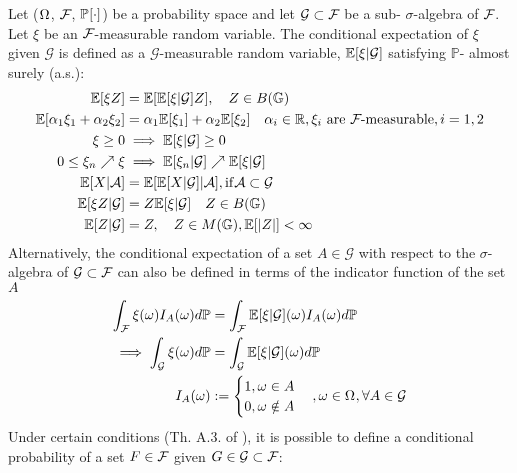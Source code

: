 \begin{defn}
	Let ($\Omega_{{}}$, $ \mathcal{F}_{{}}$, $\mathbb{P}_{{}}{[\cdot]}$) be a probability space and let $\mathcal{G} \subset \mathcal{F}_{{}}$  be a sub- $\sigma$-algebra of $\mathcal{F}_{{}}$. Let $\xi$ be an $\mathcal{F}_{{}}$-measurable random variable. The conditional expectation of $\xi$ given $\mathcal{G}$ is defined as a $\mathcal{G}$-measurable random variable, $\mathbb{E}[\xi | \mathcal{G}]$ satisfying $\mathbb{P}$- {\color{red}almost surely} (a.s.):
	\begin{align}
	 \mathbb{E}[\xi Z] & = \mathbb{E}[\mathbb{E}[\xi | \mathcal{G}]Z], \quad Z \in B(\mathbb{G}) \\
	 \mathbb{E}[\alpha_1 \xi_1 + \alpha_2 \xi_2] & = \alpha_1 \mathbb{E}[\xi_1]  + \alpha_2 \mathbb{E}[\xi_2]  \quad \alpha_i \in \mathbb{R}, \xi_i \text{ are $\mathcal{F}_{{}}$-measurable}, i = 1,2 \\
	 \xi \geq 0 & \implies \mathbb{E}[\xi | \mathcal{G}] \geq 0  \\
	 0 \leq \xi_n \nearrow \xi & \implies \mathbb{E}[\xi_n | \mathcal{G}] \nearrow \mathbb{E}[\xi | \mathcal{G}] \\
	\mathbb{E}[X|\mathcal{A}] & = \mathbb{E}[\mathbb{E}[X|\mathcal{G}]|\mathcal{A}], \mathrm{if} \mathcal{A} \subset \mathcal{G} \\
 	\mathbb{E}[\xi Z | \mathcal{G}] & = Z \mathbb{E}[\xi | \mathcal{G}] \quad Z \in B(\mathbb{G}) \\
 	\mathbb{E}[ Z | \mathcal{G}] & =Z, \quad Z \in M(\mathbb{G}), \mathbb{E}[|Z|] < \infty
	\end{align} 	
Alternatively, the conditional expectation of a set $A \in \mathcal{G}$ with respect to the $\sigma$-algebra of $\mathcal{G} \subset \mathcal{F}_{{}}$ can also be defined in terms of the indicator function of the set $A$
\begin{align}
\int_{\mathcal{F}}  \xi(\omega) I_A (\omega) d\mathbb{P} &= \int_{\mathcal{F}}  \mathbb{E}[\xi | \mathcal{G}](\omega) I_A(\omega) d\mathbb{P} \\
\implies \int_{\mathcal{G}}  \xi(\omega) d\mathbb{P} &= \int_{\mathcal{G}}  \mathbb{E}[\xi | \mathcal{G}](\omega) d\mathbb{P} \\
I_A(\omega) &:= \begin{cases}
1, \omega \in A \\
0, \omega \notin A \\
\end{cases}, \omega \in \Omega_{{}}, \forall A\in \mathcal{G}
\end{align}
Under certain conditions (Th. A.3. of \cite{bain2009}), it is possible to define a conditional probability of a set $F \in \mathcal{F}_{{}}$ given $G \in  \mathcal{G} \subset \mathcal{F}_{{}}$:

\end{defn}
